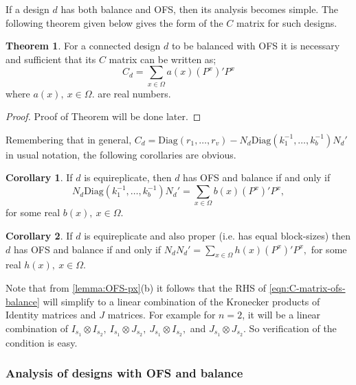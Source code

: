 \documentclass[12pt]{article}
\theoremstyle{definition}
\newtheorem{thm}{Theorem}
\newtheorem{cor}{Corollary}
\newenvironment{theorem}{
\begin{tcolorbox}[colback=green!5!white,colframe=green!75!black, parbox = false]\begin{thm} }{\end{thm}\end{tcolorbox} }
\newenvironment{corollary}{
\begin{tcolorbox}[colback=blue!5!white,colframe=blue!75!black, parbox = false]\begin{cor} }{\end{cor}\end{tcolorbox} }
\begin{document}
If a design $d$ has both balance and OFS, then its analysis becomes simple.  The following theorem given below gives the form of the  $C$ matrix for such designs. 

\begin{theorem}
    For a  connected design $d$ to be balanced with   OFS  it is necessary and sufficient that its $C$ matrix can be written as; 
    \begin{equation}
        C_d = \sum_{x \in \Omega} a(x) (P^x)'P^x
        \label{eqn:C-matrix-ofs-balance}
    \end{equation}
    where $a(x), \ x\in \Omega$. are real numbers.
\end{theorem}

\begin{proof}
    Proof of Theorem will be done later.
\end{proof}

Remembering that in general, $C_d = \mbox{Diag}(r_1, \ldots, r_v)-  N_d\mbox{Diag}(k_1^{-1}, \ldots, k_b^{-1})N_d' $ in usual notation, the following corollaries are obvious. 

\begin{corollary}
    If $d$ is equireplicate, then $d$ has OFS and balance if and only if $$N_d\mbox{Diag}(k_1^{-1}, \ldots, k_b^{-1})N_d'= \sum_{x \in \Omega} b(x)(P^x)'P^x,$$ 
    for some real $b(x), \ x\in \Omega$.
\end{corollary}

\begin{corollary}
    If $d$ is equireplicate and also proper (i.e. has equal block-sizes) then $d$ has OFS and balance if and only if $N_dN_d'= \sum_{x \in \Omega} h(x)(P^x)'P^x,$ for some real $h(x), \ x\in \Omega$.
    \label{cor:NdNd'-form}
\end{corollary}

Note that from \cref{lemma:OFS-px}(b) it follows that the RHS of \eqref{eqn:C-matrix-ofs-balance} will simplify to a linear combination of the Kronecker products of Identity matrices and $J$ matrices. For example for $n=2$, it will be a linear combination of $I_{s_1}\otimes I_{s_2}, \ I_{s_1}\otimes J_{s_2}, \ J_{s_1}\otimes I_{s_2}, $ and $ J_{s_1}\otimes J_{s_2}.$ So  verification of the condition is easy.

\subsubsection{Analysis of designs with OFS and balance}
\end{document}
